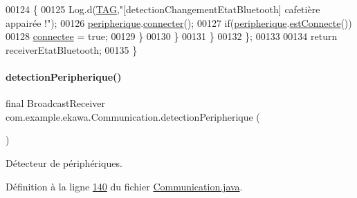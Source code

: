 \begin{DoxyCode}
00124                     \{
00125                         Log.d(\hyperlink{classcom_1_1example_1_1ekawa_1_1_communication_af355bac38153a4e6d1cda0b3e74bc1c7}{TAG},\textcolor{stringliteral}{"[detectionChangementEtatBluetooth] cafetière appairée !"});
00126                         \hyperlink{classcom_1_1example_1_1ekawa_1_1_communication_a59a25b4807148701560e4341f79c0c16}{peripherique}.\hyperlink{classcom_1_1example_1_1ekawa_1_1_peripherique_aeec8c1b360496726a5aecd6c129de81b}{connecter}();
00127                         \textcolor{keywordflow}{if}(\hyperlink{classcom_1_1example_1_1ekawa_1_1_communication_a59a25b4807148701560e4341f79c0c16}{peripherique}.\hyperlink{classcom_1_1example_1_1ekawa_1_1_peripherique_a963c20e3fba4ed926e9dee972e3b6b39}{estConnecte}())
00128                             \hyperlink{classcom_1_1example_1_1ekawa_1_1_communication_a93d9caaa9d4454a32d9dc28a6f22d2eb}{connectee} = \textcolor{keyword}{true};
00129                     \}
00130                 \}
00131             \}
00132         \};
00133 
00134         \textcolor{keywordflow}{return} receiverEtatBluetooth;
00135     \}
\end{DoxyCode}
\mbox{\label{classcom_1_1example_1_1ekawa_1_1_communication_a4e46e30e8c22ae617b52260d198a76ca}} 
\paragraph{\texorpdfstring{detection\+Peripherique()}{detectionPeripherique()}}
{\footnotesize\ttfamily final Broadcast\+Receiver com.\+example.\+ekawa.\+Communication.\+detection\+Peripherique (\begin{DoxyParamCaption}{ }\end{DoxyParamCaption})\hspace{0.3cm}{\ttfamily [private]}}



Détecteur de périphériques. 



Définition à la ligne \hyperlink{_communication_8java_source_l00140}{140} du fichier \hyperlink{_communication_8java_source}{Communication.\+java}.



